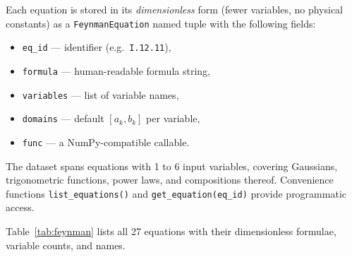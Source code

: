 \documentclass[11pt]{article}
\begin{document}
Each equation is stored in its \emph{dimensionless} form (fewer
variables, no physical constants) as a
\texttt{FeynmanEquation} named tuple with the following fields:
\begin{itemize}
  \item \texttt{eq\_id} --- identifier (e.g.\ \texttt{I.12.11}),
  \item \texttt{formula} --- human-readable formula string,
  \item \texttt{variables} --- list of variable names,
  \item \texttt{domains} --- default $[a_k,b_k]$ per variable,
  \item \texttt{func} --- a NumPy-compatible callable.
\end{itemize}
The dataset spans equations with 1 to 6 input variables, covering
Gaussians, trigonometric functions, power laws, and compositions
thereof.  Convenience functions \texttt{list\_equations()} and
\texttt{get\_equation(eq\_id)} provide programmatic access.

Table~\ref{tab:feynman} lists all 27 equations with their
dimensionless formulae, variable counts, and names.
\end{document}
